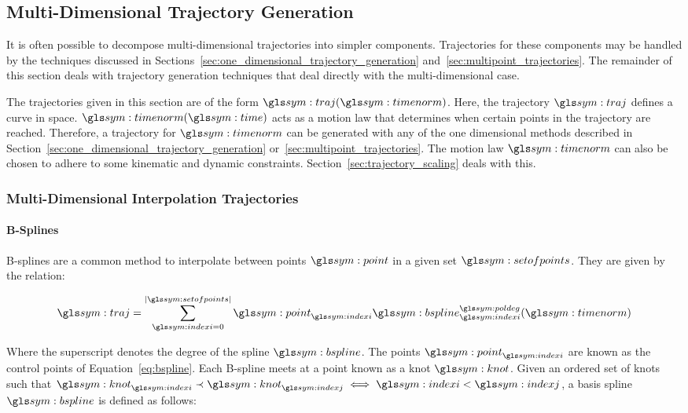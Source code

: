 	\subsection{Multi-Dimensional Trajectory Generation}%
	\label{sec:multi_dimensional_trajectory_generation}

		It is often possible to decompose multi-dimensional trajectories into
		simpler components. Trajectories for these components may be handled by
		the techniques discussed in
		Sections~\ref{sec:one_dimensional_trajectory_generation}
		and~\ref{sec:multipoint_trajectories}. The remainder of this section
		deals with trajectory generation techniques that deal directly with the
		multi-dimensional case.

		The trajectories given in this section are of the form
		$\traj(\timenorm)$. Here, the trajectory $\traj$ defines a curve in
		space. $\timenorm(\timesym)$ acts as a motion law that determines when
		certain points in the trajectory are reached. Therefore, a trajectory
		for $\timenorm$ can be generated with any of the one dimensional methods
		described in Section~\ref{sec:one_dimensional_trajectory_generation}
		or~\ref{sec:multipoint_trajectories}. The motion law $\timenorm$ can
		also be chosen to adhere to some kinematic and dynamic constraints.
		Section~\ref{sec:trajectory_scaling} deals with this.

		\subsubsection{Multi-Dimensional Interpolation Trajectories}%
		\label{sec:multi_dimensional_interpolation_trajectories}

			\paragraph{B-Splines}%
			\label{sec:b_spines}

				B-splines are a common method to interpolate between points
				$\point$ in a given set $\setofpoints$. They are given by the
				relation:

				\begin{equation}
					\traj = \sum_{\indexi = 0}^{\cardinality{\setofpoints}}
						\point_{\indexi}\bspline_{\indexi}^{\poldeg}(\timenorm)
					\label{eq:bspline}
				\end{equation}

				Where the superscript denotes the degree of the spline
				$\bspline$. The points $\point_{\indexi}$ are known as the
				control points of Equation~\ref{eq:bspline}.  Each B-spline
				meets at a point known as a knot $\knot$. Given an ordered set
				of knots such that
				\(
					\knot_{\indexi} \prec \knot_{\indexj} \iff \indexi < \indexj
				\), a basis spline $\bspline$ is defined as follows:


